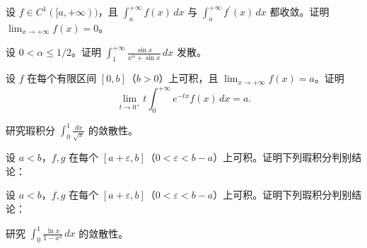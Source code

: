 \newpage
\noindent\begin{minipage}{\textwidth}
设 $f\in C^1([a,+\infty))$，且 $\int_a^{+\infty}f(x)\,dx$ 与 $\int_a^{+\infty}f^\prime(x)\,dx$ 都收敛。证明 $\lim_{x\to+\infty}f(x)=0$。
\end{minipage}\par\vfill
\noindent\begin{minipage}{\textwidth}
设 $0<\alpha\le1/2$。证明 $\displaystyle\int_1^{+\infty}\frac{\sin x}{x^\alpha+\sin x}\,dx$ 发散。
\end{minipage}\par\vfill
\noindent\begin{minipage}{\textwidth}
设 $f$ 在每个有限区间 $[0,b]$（$b>0$）上可积，且 $\lim_{x\to+\infty}f(x)=a$。证明\[\lim_{t\to0^+}t\int_0^{+\infty}e^{-tx}f(x)\,dx=a.\]
\end{minipage}\par\vfill
\newpage
\noindent\begin{minipage}{\textwidth}
研究瑕积分 $\displaystyle\int_0^1\frac{dx}{\sqrt x}$ 的敛散性。
\end{minipage}\par\vfill
\noindent\begin{minipage}{\textwidth}
设 $a<b$，$f,g$ 在每个 $[a+\varepsilon,b]$（$0<\varepsilon<b-a$）上可积。证明下列瑕积分判别结论：
\end{minipage}\par\vfill
\noindent\begin{minipage}{\textwidth}
设 $a<b$，$f,g$ 在每个 $[a+\varepsilon,b]$（$0<\varepsilon<b-a$）上可积。证明下列瑕积分判别结论：
\end{minipage}\par\vfill
\newpage
\noindent\begin{minipage}{\textwidth}
研究 $\displaystyle\int_0^1\frac{\ln x}{1-x^2}\,dx$ 的敛散性。
\end{minipage}\par\vfill
